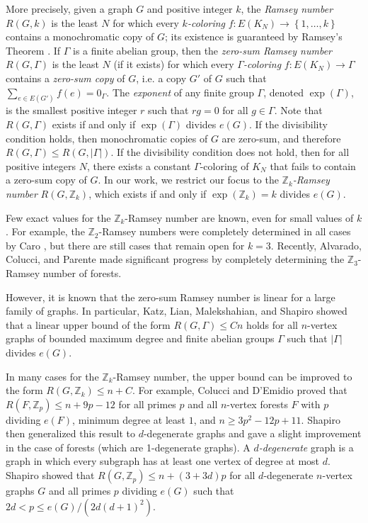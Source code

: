 \documentclass[11pt]{article}
\newcommand{\bZ}{\mathbb{Z}}
\newcommand\set[1]{\left\{ #1 \right\}}
\newcommand\abs[1]{\left\lvert #1 \right\rvert}
\newcommand\pars[1]{\left( #1 \right)}
\theoremstyle{definition}
\theoremstyle{plain}
\begin{document}
More precisely, given a graph $G$ and positive integer $k$, the \textit{Ramsey number} $R(G,k)$ is the least $N$ for which every \textit{$k$-coloring} $f:E(K_N)\to \set{1,\ldots,k}$ contains a monochromatic copy of $G$; its existence is guaranteed by Ramsey's Theorem \cite{ramsey1987problem}. If $\Gamma$ is a finite abelian group, then the \textit{zero-sum Ramsey number} $R(G,\Gamma)$ is the least $N$ (if it exists) for which every \textit{$\Gamma$-coloring} $f:E(K_N)\to \Gamma$ contains a \textit{zero-sum copy} of $G$, i.e. a copy $G'$ of $G$ such that $\sum_{e\in E(G')}f(e)=0_\Gamma$. The \textit{exponent} of any finite group $\Gamma$, denoted $\exp(\Gamma)$, is the smallest positive integer $r$ such that $rg=0$ for all $g\in \Gamma$. Note that $R(G,\Gamma)$ exists if and only if $\exp(\Gamma)$ divides $e(G)$. If the divisibility condition holds, then monochromatic copies of $G$ are zero-sum, and therefore $R(G,\Gamma)\leq R\pars{G,\abs{\Gamma}}$. If the divisibility condition does not hold, then for all positive integers $N$, there exists a constant $\Gamma$-coloring of $K_N$ that fails to contain a zero-sum copy of $G$. In our work, we restrict our focus to the \textit{$\bZ_k$-Ramsey number} $R(G,\bZ_k)$, which exists if and only if $\exp(\bZ_k)=k$ divides $e(G)$.

Few exact values for the $\bZ_k$-Ramsey number are known, even for small values of $k$. For example, the $\bZ_2$-Ramsey numbers were completely determined in all cases by Caro \cite{CARO1994205}, but there are still cases that remain open for $k=3$. Recently, Alvarado, Colucci, and Parente \cite{alvarado2025problemcaromathbbz3ramseynumber} made significant progress by completely determining the $\bZ_3$-Ramsey number of forests. 


However, it is known that the zero-sum Ramsey number is linear for a large family of graphs. In particular, Katz, Lian, Malekshahian, and Shapiro \cite{katz2025linearupperboundzerosum} showed that a linear upper bound of the form $R(G,\Gamma)\leq Cn$ holds for all $n$-vertex graphs of bounded maximum degree and finite abelian groups $\Gamma$ such that $\abs{\Gamma}$ divides $e(G)$.

In many cases for the $\bZ_k$-Ramsey number, the upper bound can be improved to the form  $R(G,\bZ_k)\leq n+C$. 
For example, Colucci and D'Emidio \cite{colucci2026linearupperboundzerosum} proved that $R(F,\bZ_p)\leq n+9p-12$ for all primes $p$ and all $n$-vertex forests $F$ with $p$ dividing $e(F)$, minimum degree at least $1$, and $n\geq 3p^2-12p+11$. Shapiro \cite{Shapiro} then generalized this result to $d$-degenerate graphs and gave a slight improvement in the case of forests (which are 1-degenerate graphs). A \textit{$d$-degenerate} graph is a graph in which every subgraph has at least one vertex of degree at most $d$. Shapiro \cite{Shapiro} showed that $R(G,\bZ_p)\leq n+(3+3d)p$ for all $d$-degenerate $n$-vertex graphs $G$ and all primes $p$ dividing $e(G)$ such that $2d<p\leq e(G)/(2d(d+1)^2)$. 
\end{document}

